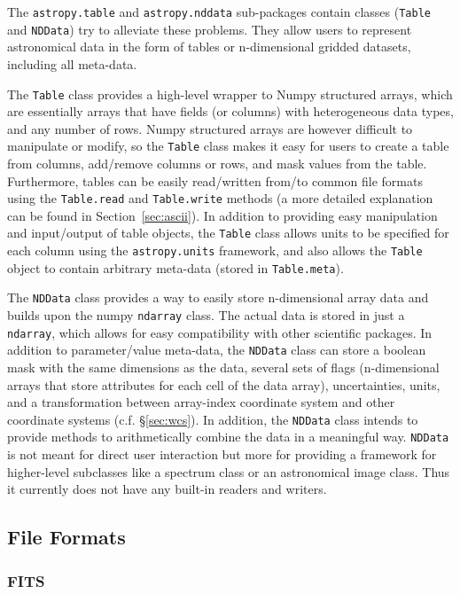\documentclass[traditabstract]{aa}
\begin{document}
The \texttt{astropy.table} and \texttt{astropy.nddata} sub-packages contain
classes (\texttt{Table} and \texttt{NDData})  try to alleviate these problems. They allow users to represent
astronomical data in the form of tables or n-dimensional gridded datasets,
including all meta-data.

The \texttt{Table} class provides a high-level wrapper to Numpy structured
arrays, which are essentially arrays that have fields (or columns) with
heterogeneous data types, and any number of rows. Numpy structured arrays are
however difficult to manipulate or modify, so the \texttt{Table} class makes
it easy for users to create a table from columns, add/remove columns or rows,
and mask values from the table. Furthermore, tables can be easily
read/written from/to common file formats using the \texttt{Table.read} and
\texttt{Table.write} methods (a more detailed explanation can be found in Section~\ref{sec:ascii}). In addition to providing easy manipulation and
input/output of table objects, the \texttt{Table} class allows units to be
specified for each column using the \texttt{astropy.units} framework, and
also allows the \texttt{Table} object to contain arbitrary meta-data (stored
in \texttt{Table.meta}).


The \texttt{NDData} class provides a way to easily store n-dimensional array data and builds upon the \gls{numpy} \texttt{ndarray} class. The actual data is stored in just a \texttt{ndarray}, which allows for easy compatibility with other scientific packages. 
In addition to parameter/value meta-data, the \texttt{NDData} class can store a boolean mask with the same dimensions as the data,
several sets of flags (n-dimensional arrays that store attributes for each cell of the data array), uncertainties, units, 
and a transformation between array-index coordinate system and other coordinate systems (c.f. \S\ref{sec:wcs}). 
In addition, the \texttt{NDData} class intends to provide methods to arithmetically combine the data in a meaningful way. 
\texttt{NDData} is not meant for direct user interaction but more for providing a framework for higher-level subclasses like a spectrum class or an astronomical image class. Thus it currently does not have any built-in readers and writers. 

\subsection{File Formats}


\subsubsection{FITS}
\end{document}
